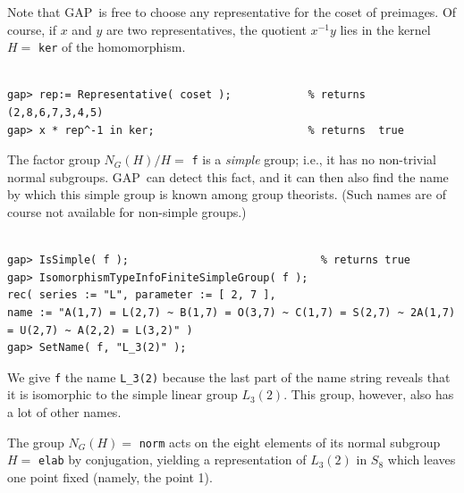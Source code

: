 \documentclass[11pt]{amsart}
\newcommand{\gap}{GAP}   %
\theoremstyle{plain}
\newcommand{\codesize}{\footnotesize}
\newcommand{\<}{\ensuremath{\langle}}
\renewcommand{\>}{\ensuremath{\rangle}}
\begin{document}
\noindent Note that \gap\ is free to choose any representative for the coset of preimages. Of
course, if $x$ and $y$ are two representatives, the quotient $x^{-1}y$ lies in the
kernel $H= $ {\tt ker} of the homomorphism.
{\codesize
\begin{verbatim}

gap> rep:= Representative( coset );            % returns  (2,8,6,7,3,4,5)
gap> x * rep^-1 in ker;                        % returns  true

\end{verbatim}}
\noindent The factor group $ N_G(H)/H = $ {\tt f} is a \emph{simple} group; i.e., it has no non-trivial normal
subgroups. 
\gap\ can detect this fact, and it can then also find the name by which this simple
group is known among group theorists. (Such names are of course not available for
non-simple groups.)
{\codesize
\begin{verbatim}

gap> IsSimple( f );                              % returns true
gap> IsomorphismTypeInfoFiniteSimpleGroup( f );  
rec( series := "L", parameter := [ 2, 7 ],
name := "A(1,7) = L(2,7) ~ B(1,7) = O(3,7) ~ C(1,7) = S(2,7) ~ 2A(1,7) = U(2,7) ~ A(2,2) = L(3,2)" )
gap> SetName( f, "L_3(2)" );

\end{verbatim}}
\noindent We give {\tt f} the name \verb!L_3(2)! because the last part of the name string reveals that it is isomorphic to the
simple linear group $L_3(2)$. This group, however, also has a lot of other names. 

The group $N_G(H)= $ {\tt norm} acts on the eight elements of its normal subgroup $H
= $ {\tt elab} by conjugation, yielding a representation
of $L_3(2)$ in $S_8$ which leaves one point fixed (namely, the point 1).
\end{document}
